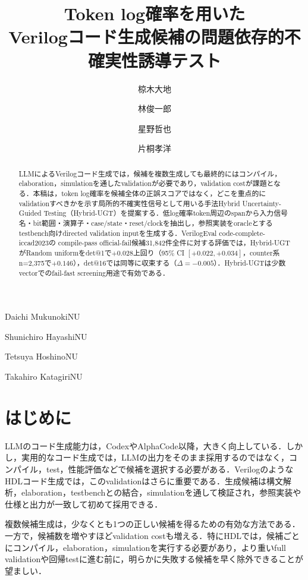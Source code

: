 \documentclass[submit,techrep,noauthor]{ipsj}
\begin{document}
\title{Token log確率を用いた\\Verilogコード生成候補の問題依存的不確実性誘導テスト}


\author{椋木大地}{Daichi Mukunoki}{NU}
\author{林俊一郎}{Shunichiro Hayashi}{NU}
\author{星野哲也}{Tetsuya Hoshino}{NU}
\author{片桐孝洋}{Takahiro Katagiri}{NU}

\begin{abstract}
LLMによるVerilogコード生成では，候補を複数生成しても最終的にはコンパイル，elaboration，simulationを通したvalidationが必要であり，validation costが課題となる．本稿は，token log確率を候補全体の正誤スコアではなく，どこを重点的にvalidationすべきかを示す局所的不確実性信号として用いる手法Hybrid Uncertainty-Guided Testing（Hybrid-UGT）を提案する．低log確率token周辺のspanから入力信号名・bit範囲・演算子・case/state・reset/clockを抽出し，参照実装をoracleとするtestbench向けdirected validation inputを生成する．VerilogEval code-complete-iccad2023の compile-pass official-fail候補31,842件全件に対する評価では，Hybrid-UGTがRandom uniformをdet@1で$+0.028$上回り（95\% CI $[+0.022, +0.034]$，counter系n=2,375で$+0.146$），det@16では同等に収束する（$\Delta=-0.005$）．Hybrid-UGTは少数vectorでのfail-fast screening用途で有効である．
\end{abstract}

\maketitle

\section{はじめに}

LLMのコード生成能力は，Codex\cite{chen2021codex}やAlphaCode\cite{li2022alphacode}以降，大きく向上している．しかし，実用的なコード生成では，LLMの出力をそのまま採用するのではなく，コンパイル，test，性能評価などで候補を選択する必要がある．VerilogのようなHDLコード生成では，このvalidationはさらに重要である．生成候補は構文解析，elaboration，testbenchとの結合，simulationを通して検証され，参照実装や仕様と出力が一致して初めて採用できる．

複数候補生成は，少なくとも1つの正しい候補を得るための有効な方法である．一方で，候補数を増やすほどvalidation costも増える．特にHDLでは，候補ごとにコンパイル，elaboration，simulationを実行する必要があり，より重いfull validationや回帰testに進む前に，明らかに失敗する候補を早く除外できることが望ましい．
\end{document}
